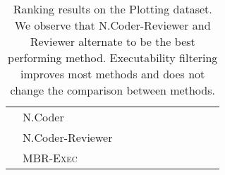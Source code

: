 \documentclass[nohyperref]{article}
\theoremstyle{plain}
\theoremstyle{definition}
\theoremstyle{remark}
\begin{document}
\begin{table*}[]
\begin{tabular}{l|lccccccccc}
\cmidrule{2-10}
    & N.Coder &               &               &               &            &               &               &               &               \\
    & N.Coder-Reviewer &      &      &      &            &   &   &               &   \\
\cmidrule{2-10}
    & MBR-\textsc{Exec} &               &               &               &            &                &               &               &               \\
\bottomrule
\end{tabular}
 \caption{
Ranking results on the Plotting dataset. We observe that N.Coder-Reviewer and Reviewer alternate to be the best performing method. Executability filtering improves most methods and does not change the comparison between methods.
}
\label{tab:app_plotting_exec}
\end{table*}
\end{document}
